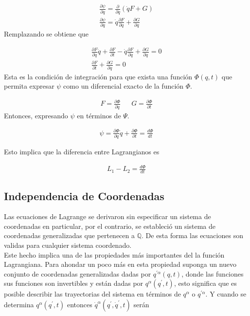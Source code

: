 \begin{gather*}
    \frac{\partial \psi}{\partial q} = \frac{\partial }{\partial q}(\dot{q}F + G)\\
    \frac{\partial \psi}{\partial q} = \dot{q}\frac{\partial F}{\partial q} + \frac{\partial G}{\partial q}
\end{gather*}
Remplazando se obtiene que 

\begin{gather*}
    \frac{\partial F}{\partial q}\dot{q} + \frac{\partial F}{\partial t} -\dot{q}\frac{\partial F}{\partial q} + \frac{\partial G}{\partial q} = 0\\
    \frac{\partial F}{\partial t} + \frac{\partial G}{\partial q} = 0
\end{gather*}
Esta es la condición de integración para que exista una función $\Phi(q,t)$ que permita expresar $\psi$ como un diferencial exacto de la función $\Phi$.

\begin{align*}
    F = \frac{\partial \Phi}{\partial q} &&G = \frac{\partial \Phi}{\partial t} 
\end{align*}
Entonces, expresando $\psi$ en términos de $\Psi$.

\begin{gather*}
    \psi = \frac{\partial \Phi}{\partial q}\dot{q} + \frac{\partial \Phi}{\partial t} = \frac{d\Phi}{dt}
\end{gather*}

Esto implica que la diferencia entre Lagrangianos es

\begin{gather}
    \label{eq:difl}L_1 - L_2 = \frac{d\Phi}{dt}
\end{gather}


\subsection[short]{Independencia de Coordenadas}


Las ecuaciones de Lagrange se derivaron sin especificar un sistema de coordenadas en particular, por el contrario, se estableció un sistema de coordenadas generalizadas que pertenecen a $\mathbb{Q}$. De esta forma las ecuaciones son validas para cualquier sistema coordenado. \newline
\\\newline
Este hecho implica una de las propiedades más importantes del la función Lagrangiana. Para ahondar un poco más en esta propiedad suponga un nuevo conjunto de coordenadas generalizadas dadas por $q^{\prime\alpha}(q,t)$, donde las funciones sus funciones son invertibles y están dadas por $q^{\alpha}(q^{\prime}, t)$, esto significa que es posible describir las trayectorias del sistema en términos de $q^{\alpha}$ o $q^{\prime\alpha}$. Y cuando se determina $q^{\alpha}(q^{\prime},t)$  entonces $\dot{q}^{\alpha}(q^{\prime},\dot{q}^{\prime},t)$ serán

